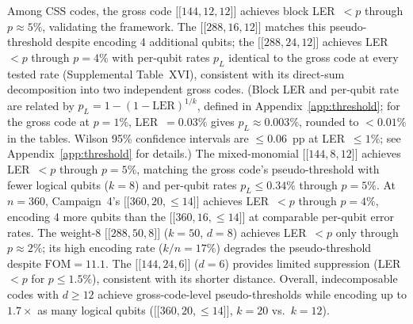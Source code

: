 \documentclass[aps,prxquantum,twocolumn,superscriptaddress,nofootinbib]{revtex4-2}
\newcommand{\dblbrk}[1]{\ensuremath{\lbrack\!\lbrack #1 \rbrack\!\rbrack}}
\newcommand{\code}[1]{\dblbrk{#1}}
\newcommand{\FOM}{\ensuremath{\mathrm{FOM}}}
\begin{document}
Among CSS codes, the gross code $\code{144,12,12}$ achieves block LER~$< p$ through $p \approx 5\%$, validating the framework.
The $\code{288,16,12}$ matches this pseudo-threshold despite encoding 4 additional qubits; the $\code{288,24,12}$ achieves LER~$< p$ through $p = 4\%$ with per-qubit rates $p_L$ identical to the gross code at every tested rate (Supplemental Table~XVI), consistent with its direct-sum decomposition into two independent gross codes.
(Block LER and per-qubit rate are related by $p_L = 1 - (1-\text{LER})^{1/k}$, defined in Appendix~\ref{app:threshold}; for the gross code at $p = 1\%$, LER~$= 0.03\%$ gives $p_L \approx 0.003\%$, rounded to ${<}0.01\%$ in the tables. Wilson 95\% confidence intervals are $\leq 0.06$~pp at LER~$\leq 1\%$; see Appendix~\ref{app:threshold} for details.)
The mixed-monomial $\code{144,8,12}$ achieves LER~$< p$ through $p = 5\%$, matching the gross code's pseudo-threshold with fewer logical qubits ($k = 8$) and per-qubit rates $p_L \leq 0.34\%$ through $p = 5\%$.
At $n = 360$, Campaign~4's $\code{360,20,{\leq}14}$ achieves LER~$< p$ through $p = 4\%$, encoding 4 more qubits than the $\code{360,16,{\leq}14}$ at comparable per-qubit error rates.
The weight-8 $\code{288,50,8}$ ($k = 50$, $d = 8$) achieves LER~$< p$ only through $p \approx 2\%$; its high encoding rate ($k/n = 17\%$) degrades the pseudo-threshold despite $\FOM = 11.1$.
The $\code{144,24,6}$ ($d = 6$) provides limited suppression (LER~$< p$ for $p \leq 1.5\%$), consistent with its shorter distance.
Overall, indecomposable codes with $d \geq 12$ achieve gross-code-level pseudo-thresholds while encoding up to $1.7\times$ as many logical qubits ($\code{360,20,{\leq}14}$, $k = 20$ vs.\ $k = 12$).
\end{document}
